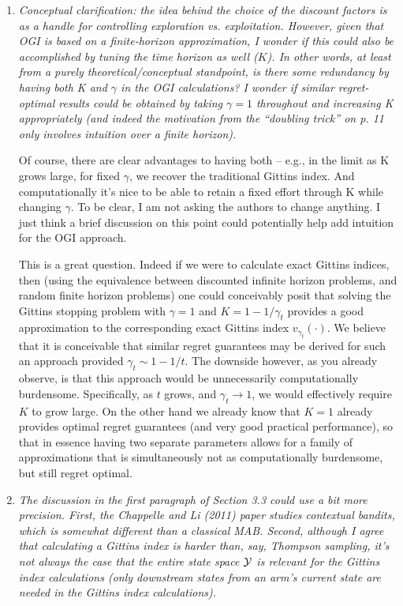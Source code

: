 \documentclass[11pt]{article}
\newcommand{\1}{\ensuremath{\mathbf{1}}} %
\newcommand{\tends}{\ensuremath{\rightarrow}} %
\theoremstyle{thm-sf}
\begin{document}
\begin{enumerate}
		
		
		\item {\it Conceptual clarification: the idea behind the choice of the discount factors is as a handle for controlling exploration vs. exploitation. However, given that OGI is based on a finite-horizon approximation, I wonder if this could also be accomplished by tuning the time horizon as well ($K$). In other words, at least from a purely theoretical/conceptual standpoint, is there some redundancy by having both K and $\gamma$ in the OGI calculations? I wonder if similar regret-optimal results could be obtained by taking $\gamma=1$ throughout and increasing K appropriately (and indeed the motivation from the “doubling trick” on p. 11 only involves intuition over a finite horizon).
	   
	   Of course, there are clear advantages to having both – e.g., in the limit as K grows large, for fixed $\gamma$, we recover the traditional Gittins index. And computationally it’s nice to be able to retain a fixed effort through K while changing $\gamma$.
	   To be clear, I am not asking the authors to change anything. I just think a brief discussion on this point could potentially help add intuition for the OGI approach.	
	}

	
This is a great question. Indeed if we were to calculate exact Gittins indices, then (using the equivalence between discounted infinite horizon problems, and random finite horizon problems) one could conceivably posit that solving the Gittins stopping problem with $\gamma = 1$ and $K = 1 - 1/\gamma_t$ provides a good approximation to the corresponding exact Gittins index $v_{\gamma_t}(\cdot)$. We believe that it is conceivable that similar regret guarantees may be derived for such an approach provided $\gamma_t \sim 1- 1/t$. The downside however, as you already observe, is that this approach would be unnecessarily computationally burdensome. Specifically, as $t$ grows, and $\gamma_t \tends 1$, we would effectively require $K$ to grow large. On the other hand we already know that $K=1$ already provides optimal regret guarantees (and very good practical performance), so that in essence having two separate parameters allows for a family of approximations that is simultaneously not as computationally burdensome, but still regret optimal. 




		
	\item {\it The discussion in the first paragraph of Section 3.3 could use a bit more precision. First, the Chappelle and Li (2011) paper studies contextual bandits, which is somewhat different than a classical MAB. Second, although I agree that calculating a Gittins index is harder than, say, Thompson sampling, it’s not always the case that the entire state space $\cal{Y}$ is relevant for the Gittins index calculations (only downstream states from an arm’s current state are needed in the Gittins index calculations).}
	

\end{enumerate}
\end{document}
